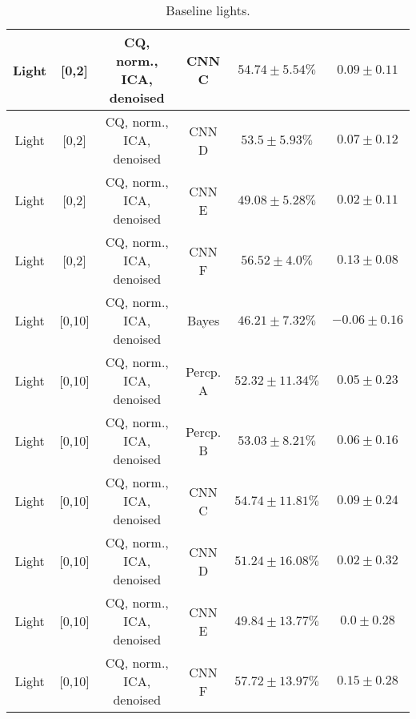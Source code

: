 \begin{table}[!htb]
{\begin{tabular}{c|c|c|c|c|c}
    \hline
    Light               & [0,2]                                & \scriptsize{CQ, norm., ICA, denoised}& CNN C                 &  $54.74 \pm 5.54\%$   & $0.09 \pm 0.11$\\  
    \hline
    Light               & [0,2]                                & \scriptsize{CQ, norm., ICA, denoised}& CNN D                 &  $53.5 \pm 5.93\%$    & $0.07 \pm 0.12$\\  
    \hline
    Light               & [0,2]                                & \scriptsize{CQ, norm., ICA, denoised}& CNN E                 &  $49.08 \pm 5.28\%$   & $0.02 \pm 0.11$\\  
    \hline
    Light               & [0,2]                                & \scriptsize{CQ, norm., ICA, denoised}& CNN F                 &  $56.52 \pm 4.0\%$    & $0.13 \pm 0.08$\\  
    \hline
    Light               & [0,10]                               & \scriptsize{CQ, norm., ICA, denoised}& Bayes                 &  $46.21 \pm 7.32\%$   & $-0.06 \pm 0.16$\\ 
    \hline
    Light               & [0,10]                               & \scriptsize{CQ, norm., ICA, denoised}& Percp. A              &  $52.32 \pm 11.34\%$  & $0.05 \pm 0.23$\\ 
    \hline
    Light               & [0,10]                               & \scriptsize{CQ, norm., ICA, denoised}& Percp. B              &  $53.03 \pm 8.21\%$   & $0.06 \pm 0.16$\\  
    \hline
    Light               & [0,10]                               & \scriptsize{CQ, norm., ICA, denoised}& CNN C                 &  $54.74 \pm 11.81\%$  & $0.09 \pm 0.24$\\  
    \hline
    Light               & [0,10]                               & \scriptsize{CQ, norm., ICA, denoised}& CNN D                 &  $51.24 \pm 16.08\%$  & $0.02 \pm 0.32$\\  
    \hline
    Light               & [0,10]                               & \scriptsize{CQ, norm., ICA, denoised}& CNN E                 &  $49.84 \pm 13.77\%$  & $0.0 \pm 0.28$\\    
    \hline
    Light               & [0,10]                               & \scriptsize{CQ, norm., ICA, denoised}& CNN F                 &  $57.72 \pm 13.97\%$  & $0.15 \pm 0.28$\\   
    \hline
\end{tabular}
}
\caption{Baseline lights.}
\label{tab:lights-denoised-app}
\end{table}